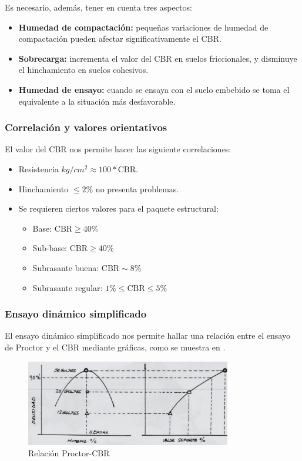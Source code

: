 \documentclass[../main.tex]{subfiles}
\begin{document}
Es necesario, además, tener en cuenta tres aspectos:

\begin{itemize}
  \item \textbf{Humedad de compactación:} pequeñas variaciones de humedad de
    compactación pueden afectar significativamente el CBR.
  \item \textbf{Sobrecarga:} incrementa el valor del CBR en suelos friccionales,
    y disminuye el hinchamiento en suelos cohesivos.
  \item \textbf{Humedad de ensayo:} cuando se ensaya con el suelo embebido se
    toma el equivalente a la situación más desfavorable.
\end{itemize}

\subsubsection{Correlación y valores orientativos}

El valor del CBR nos permite hacer las siguiente correlaciones:

\begin{itemize}
  \item Resistencia $kg/cm^2 \approx 100 * \text{CBR}$.
  \item Hinchamiento $\leq 2\%$ no presenta problemas.
  \item Se requieren ciertos valores para el paquete estructural:
    \begin{itemize}
    \item Base: $\text{CBR} \geq 40\%$
    \item Sub-base: $\text{CBR} \geq  40\%$
    \item Subrasante buena: $\text{CBR} \sim 8\%$    
    \item Subrasante regular: $1\% \leq \text{CBR} \leq 5\%$
    \end{itemize}
\end{itemize}

\subsubsection{Ensayo dinámico simplificado}

El ensayo dinámico simplificado nos permite hallar una relación entre el
ensayo de Proctor y el CBR mediante gráficas, como se muestra en 
.

\begin{figure}[htpb]
  \centering
  \includegraphics[width=0.8\textwidth]{../images/20210422/proctorcbr}
  \caption{Relación Proctor-CBR}
  \label{fig:proctorcbr}
\end{figure}
\end{document}
